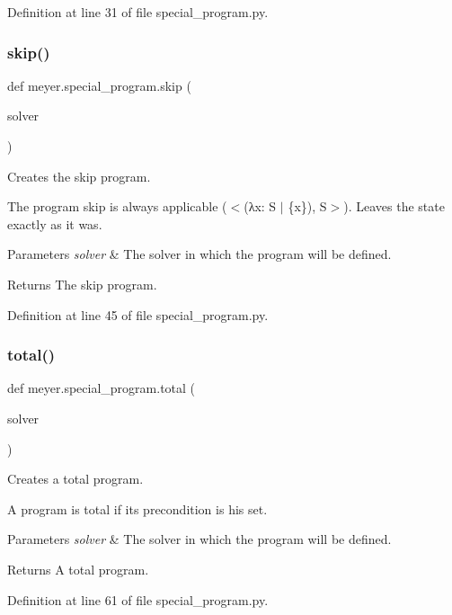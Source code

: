Definition at line 31 of file special\+\_\+program.\+py.

\mbox{\label{namespacemeyer_1_1special__program_acb9cc59171a05af2110ca447780028c4}} 
\subsubsection{\texorpdfstring{skip()}{skip()}}
{\footnotesize\ttfamily def meyer.\+special\+\_\+program.\+skip (\begin{DoxyParamCaption}\item[{}]{solver }\end{DoxyParamCaption})}



Creates the skip program. 

The program skip is always applicable ($<$(λx\+: S $\vert$ \{x\}), S$>$). Leaves the state exactly as it was. 
\begin{DoxyParams}{Parameters}
{\em solver} & The solver in which the program will be defined. \\
\hline
\end{DoxyParams}
\begin{DoxyReturn}{Returns}
The skip program. 
\end{DoxyReturn}


Definition at line 45 of file special\+\_\+program.\+py.

\mbox{\label{namespacemeyer_1_1special__program_a16ef00406a38891967508e7b6b02cd9b}} 
\subsubsection{\texorpdfstring{total()}{total()}}
{\footnotesize\ttfamily def meyer.\+special\+\_\+program.\+total (\begin{DoxyParamCaption}\item[{}]{solver }\end{DoxyParamCaption})}



Creates a total program. 

A program is total if its precondition is his set. 
\begin{DoxyParams}{Parameters}
{\em solver} & The solver in which the program will be defined. \\
\hline
\end{DoxyParams}
\begin{DoxyReturn}{Returns}
A total program. 
\end{DoxyReturn}


Definition at line 61 of file special\+\_\+program.\+py.

